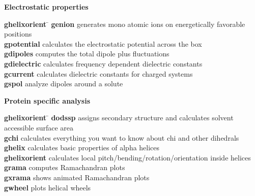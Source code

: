 \begin{description}
\item {\large\bf Electrostatic properties}
\vspace{-2ex}\begin{tabbing}
{\bf g\us{}helixorient} \= \kill
{\bf genion} \> generates mono atomic ions on energetically favorable positions \\
{\bf g\us{}potential} \> calculates the electrostatic potential across the box \\
{\bf g\us{}dipoles} \> computes the total dipole plus fluctuations \\
{\bf g\us{}dielectric} \> calculates frequency dependent dielectric constants \\
{\bf g\us{}current} \> calculates dielectric constants for charged systems \\
{\bf g\us{}spol} \> analyze dipoles around a solute \\
\end{tabbing}\vspace{-2ex}

\item {\large\bf Protein specific analysis}
\vspace{-2ex}\begin{tabbing}
{\bf g\us{}helixorient} \= \kill
{\bf do\us{}dssp} \> assigns secondary structure and calculates solvent accessible surface area \\
{\bf g\us{}chi} \> calculates everything you want to know about chi and other dihedrals \\
{\bf g\us{}helix} \> calculates basic properties of alpha helices \\
{\bf g\us{}helixorient} \> calculates local pitch/bending/rotation/orientation inside helices \\
{\bf g\us{}rama} \> computes Ramachandran plots \\
{\bf g\us{}xrama} \> shows animated Ramachandran plots \\
{\bf g\us{}wheel} \> plots helical wheels \\
\end{tabbing}\vspace{-2ex}


\end{description}
